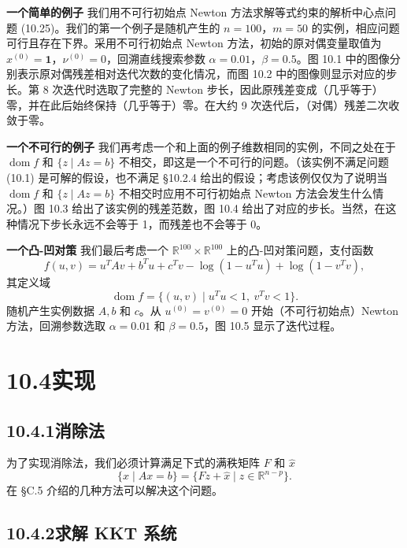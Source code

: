 \documentclass[UTF8,12pt,a4paper,fontset=fandol]{ctexart}
\begin{document}
\noindent\textbf{一个简单的例子}\quad
我们用不可行初始点 Newton 方法求解等式约束的解析中心点问题 (10.25)。我们的第一个例子是随机产生的 $n=100$，$m=50$ 的实例，相应问题可行且存在下界。采用不可行初始点 Newton 方法，初始的原对偶变量取值为 $x^{(0)}=\mathbf{1}$，$\nu^{(0)}=0$，回溯直线搜索参数 $\alpha=0.01$，$\beta=0.5$。图 10.1 中的图像分别表示原对偶残差相对迭代次数的变化情况，而图 10.2 中的图像则显示对应的步长。第 8 次迭代时选取了完整的 Newton 步长，因此原残差变成（几乎等于）零，并在此后始终保持（几乎等于）零。在大约 9 次迭代后，（对偶）残差二次收敛于零。

\noindent\textbf{一个不可行的例子}\quad
我们再考虑一个和上面的例子维数相同的实例，不同之处在于 $\operatorname{dom} f$ 和 $\{z\mid Az=b\}$ 不相交，即这是一个不可行的问题。（该实例不满足问题 (10.1) 是可解的假设，也不满足 \S10.2.4 给出的假设；考虑该例仅仅为了说明当 $\operatorname{dom} f$ 和 $\{z\mid Az=b\}$ 不相交时应用不可行初始点 Newton 方法会发生什么情况。）图 10.3 给出了该实例的残差范数，图 10.4 给出了对应的步长。当然，在这种情况下步长永远不会等于 1，而残差也不会等于 0。

\noindent\textbf{一个凸-凹对策}\quad
我们最后考虑一个 $\mathbb{R}^{100}\times\mathbb{R}^{100}$ 上的凸-凹对策问题，支付函数
\begin{equation}
f(u,v)=u^TAv+b^Tu+c^Tv-\log(1-u^Tu)+\log(1-v^Tv),
\tag{10.32}
\end{equation}
其定义域
\[
\operatorname{dom} f=\{(u,v)\mid u^Tu<1,\ v^Tv<1\}.
\]
随机产生实例数据 $A,b$ 和 $c$。从 $u^{(0)}=v^{(0)}=0$ 开始（不可行初始点）Newton 方法，回溯参数选取 $\alpha=0.01$ 和 $\beta=0.5$，图 10.5 显示了迭代过程。

\section*{10.4\quad 实现}

\subsection*{10.4.1\quad 消除法}

为了实现消除法，我们必须计算满足下式的满秩矩阵 $F$ 和 $\hat{x}$
\[
\{x\mid Ax=b\}=\{Fz+\hat{x}\mid z\in\mathbb{R}^{n-p}\}.
\]
在 \S C.5 介绍的几种方法可以解决这个问题。

\subsection*{10.4.2\quad 求解 KKT 系统}
\end{document}
